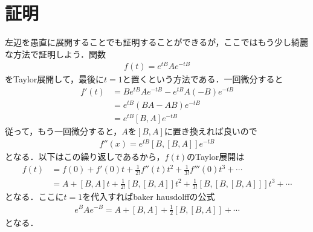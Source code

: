\documentclass[a4j]{jarticle}
\begin{document}
\section{証明}
左辺を愚直に展開することでも証明することができるが，ここではもう少し綺麗な方法で証明しよう．関数
\begin{align*}
 f(t)=e^{tB}Ae^{-tB}
\end{align*}
をTaylor展開して，最後に$t=1$と置くという方法である．一回微分すると
\begin{align*}
 f'(t)&=Be^{tB}Ae^{-tB}-e^{tB}A(-B)e^{-tB} \\
 &=e^{tB}\left(BA-AB\right)e^{-tB} \\
 &=e^{tB}[B,A]e^{-tB}
\end{align*}
従って，もう一回微分すると，$A$を$[B,A]$に置き換えれば良いので
\begin{align*}
 f''(x)=e^{tB}\left[B,[B,A]\right]e^{-tB}
\end{align*}
となる．以下はこの繰り返しであるから，$f(t)$のTaylor展開は
\begin{align*}
 f(t)&=f(0)+f'(0)t+\frac{1}{2!}f''(t)t^2+\frac{1}{3!}f'''(0)t^3+\cdots \\
&=A+[B,A]t+\frac{1}{2!}\left[B,[B,A]\right]t^2+\frac{1}{3!}\left[B,\left[B,[B,A]\right]\right]t^3+\cdots 
\end{align*}
となる．ここに$t=1$を代入すればbaker hausdolffの公式
\begin{align*}
 e^{B}Ae^{-B}=A+[B,A]+\frac{1}{2}\left[B,[B,A]\right]+\cdots
\end{align*}
となる．
\end{document}

